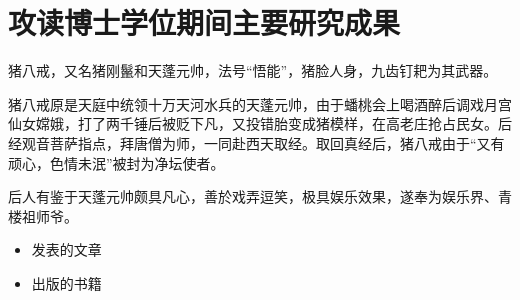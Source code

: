 \chapter*{攻读博士学位期间主要研究成果}

猪八戒，又名猪刚鬣和天蓬元帅，法号“悟能”，猪脸人身，九齿钉耙为其武器。

猪八戒原是天庭中统领十万天河水兵的天蓬元帅，由于蟠桃会上喝酒醉后调戏月宫仙女嫦娥，打了两千锤后被贬下凡，又投错胎变成猪模样，在高老庄抢占民女。后经观音菩萨指点，拜唐僧为师，一同赴西天取经。取回真经后，猪八戒由于“又有顽心，色情未泯”被封为净坛使者。

后人有鉴于天蓬元帅颇具凡心，善於戏弄逗笑，极具娱乐效果，遂奉为娱乐界、青楼祖师爷。

\begin{itemize}
\item 发表的文章
\item 出版的书籍
\end{itemize}